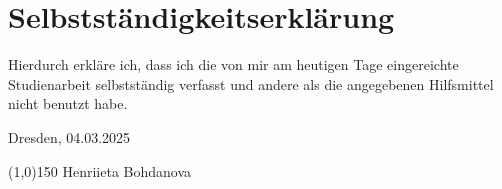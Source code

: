 \chapter*{Selbstständigkeitserklärung}


	

Hierdurch erkläre ich, dass ich die von mir am heutigen Tage eingereichte Studienarbeit selbstständig verfasst und andere als die angegebenen Hilfsmittel nicht benutzt habe.
		
\vspace{5mm}
	
Dresden, 04.03.2025
		
\vspace{15mm}
	
\begin{minipage}[t]{5,5cm}
	\line(1,0){150}
	\vspace{1em}
	Henriieta Bohdanova
\end{minipage}\hspace{4cm}



\cleardoublepage
